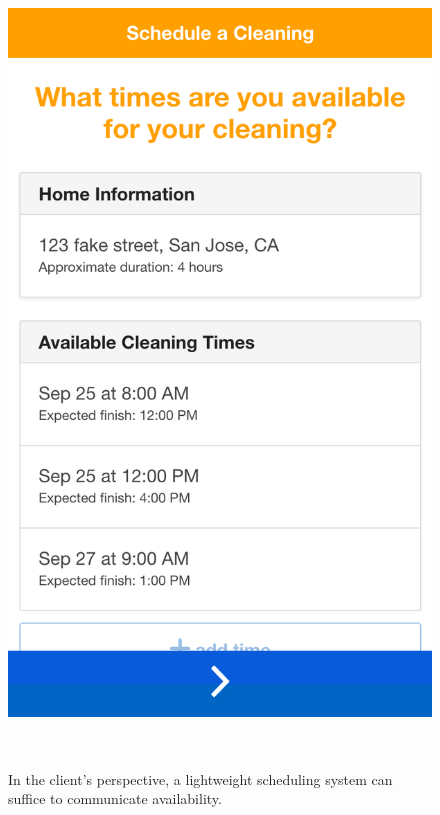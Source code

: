 \begin{figure}[t]
\centering
  \includegraphics[width=1\columnwidth]{figures/scheduling}
    \caption{In the client's perspective, a lightweight scheduling system can suffice to communicate availability.}~\label{fig:clientSchedule}
\end{figure}
